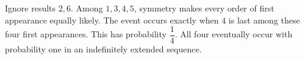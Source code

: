 Ignore results $2,6$. Among $1,3,4,5$, symmetry makes every order of first appearance equally likely. The event occurs exactly when $4$ is last among these four first appearances. This has probability $\boxed{\dfrac{1}{4}}$. All four eventually occur with probability one in an indefinitely extended sequence.
